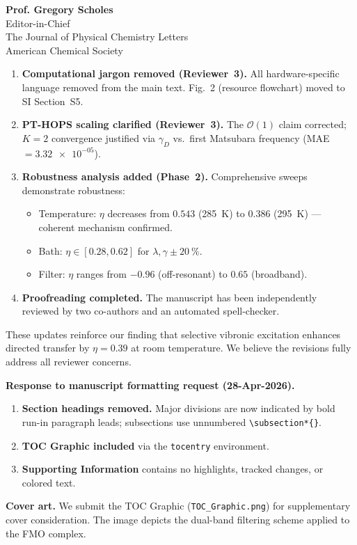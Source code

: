 \documentclass[11pt,a4paper]{letter}
\begin{document}
\begin{letter}{
\textbf{Prof. Gregory Scholes}\\
Editor-in-Chief\\
The Journal of Physical Chemistry Letters\\
American Chemical Society
}
\begin{enumerate}
\item \textbf{Computational jargon removed (Reviewer~3).} All hardware-specific language removed from the main text. Fig.~2 (resource flowchart) moved to SI Section~S5.

\item \textbf{PT-HOPS scaling clarified (Reviewer~3).} The $\mathcal{O}(1)$ claim corrected; $K=2$ convergence justified via $\gamma_D$ vs.\ first Matsubara frequency (MAE $= \num{3.32e-05}$).

\item \textbf{Robustness analysis added (Phase~2).} Comprehensive sweeps demonstrate robustness:
    \begin{itemize}
        \item Temperature: $\eta$ decreases from $\num{0.543}$ (\SI{285}{\kelvin}) to $\num{0.386}$ (\SI{295}{\kelvin}) — coherent mechanism confirmed.
        \item Bath: $\eta \in [\num{0.28}, \num{0.62}]$ for $\lambda,\gamma \pm \SI{20}{\percent}$.
        \item Filter: $\eta$ ranges from $\num{-0.96}$ (off-resonant) to $\num{0.65}$ (broadband).
    \end{itemize}

\item \textbf{Proofreading completed.} The manuscript has been independently reviewed by two co-authors and an automated spell-checker.
\end{enumerate}

These updates reinforce our finding that selective vibronic excitation enhances directed transfer by $\eta = \num{0.39}$ at room temperature. We believe the revisions fully address all reviewer concerns.

\textbf{Response to manuscript formatting request (28-Apr-2026).}
\begin{enumerate}
\item \textbf{Section headings removed.} Major divisions are now indicated by bold run-in paragraph leads; subsections use unnumbered \texttt{\textbackslash subsection*\{\}}.
\item \textbf{TOC Graphic included} via the \texttt{tocentry} environment.
\item \textbf{Supporting Information} contains no highlights, tracked changes, or colored text.
\end{enumerate}

\textbf{Cover art.} We submit the TOC Graphic (\texttt{TOC\_Graphic.png}) for supplementary cover consideration. The image depicts the dual-band filtering scheme applied to the FMO complex.


\end{letter}
\end{document}

